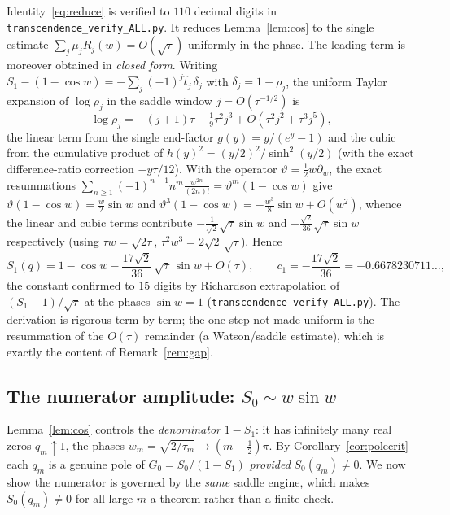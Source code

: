 \noindent Identity~\eqref{eq:reduce} is verified to $110$ decimal digits in
\texttt{transcendence\_verify\_ALL.py}. It reduces Lemma~\ref{lem:cos} to the single
estimate $\sum_j\mu_jR_j(w)=O(\sqrt\tau)$ uniformly in the phase. The leading term is
moreover obtained in \emph{closed form}. Writing $S_1-(1-\cos w)=-\sum_j(-1)^j\hat
t_j\,\delta_j$ with $\delta_j=1-\rho_j$, the uniform Taylor expansion of $\log\rho_j$
in the saddle window $j=O(\tau^{-1/2})$ is
\[
  \log\rho_j=-(j{+}1)\tau-\tfrac{1}{9}\tau^{2}j^{3}+O(\tau^{2}j^{2}+\tau^{3}j^{5}),
\]
the linear term from the single end-factor $g(y)=y/(e^{y}-1)$ and the cubic from the
cumulative product of $h(y)^2=(y/2)^2/\sinh^2(y/2)$ (with the exact difference-ratio
correction $-y\tau/12$). With the operator $\vartheta=\tfrac12 w\partial_w$, the exact
resummations $\sum_{n\ge1}(-1)^{n-1}n^{m}\tfrac{w^{2n}}{(2n)!}=\vartheta^{m}(1-\cos w)$
give $\vartheta(1-\cos w)=\tfrac{w}{2}\sin w$ and $\vartheta^{3}(1-\cos
w)=-\tfrac{w^{3}}{8}\sin w+O(w^{2})$, whence the linear and cubic terms contribute
$-\tfrac1{\sqrt2}\sqrt\tau\sin w$ and $+\tfrac{\sqrt2}{36}\sqrt\tau\sin w$ respectively
(using $\tau w=\sqrt{2\tau}$, $\tau^{2}w^{3}=2\sqrt2\,\sqrt\tau$). Hence
\begin{equation}\label{eq:c1}
  S_1(q)=1-\cos w-\frac{17\sqrt2}{36}\,\sqrt\tau\,\sin w+O(\tau),\qquad
  c_1=-\frac{17\sqrt2}{36}=-0.6678230711\ldots,
\end{equation}
the constant confirmed to $15$ digits by Richardson extrapolation of $(S_1-1)/\sqrt\tau$
at the phases $\sin w=1$ (\texttt{transcendence\_verify\_ALL.py}). The derivation is
rigorous term by term; the one step not made uniform is the resummation of the
$O(\tau)$ remainder (a Watson/saddle estimate), which is exactly the content of
Remark~\ref{rem:gap}.

\subsection{The numerator amplitude: \texorpdfstring{$S_0\sim w\sin w$}{S0 ~ w sin w}}
\label{ss:numerator}

Lemma~\ref{lem:cos} controls the \emph{denominator} $1-S_1$: it has infinitely many
real zeros $q_m\uparrow1$, the phases $w_m=\sqrt{2/\tau_m}\to(m-\tfrac12)\pi$. By
Corollary~\ref{cor:polecrit} each $q_m$ is a genuine pole of $G_0=S_0/(1-S_1)$ \emph{provided}
$S_0(q_m)\ne0$. We now show the numerator is governed by the \emph{same} saddle engine,
which makes $S_0(q_m)\ne0$ for all large $m$ a theorem rather than a finite check.

